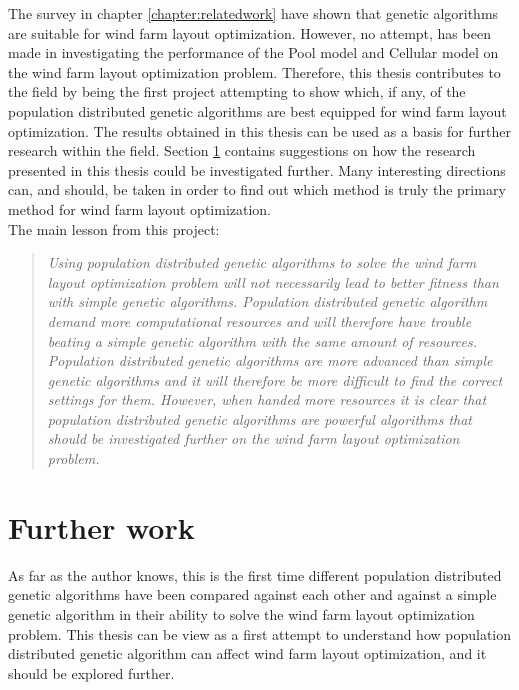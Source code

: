 \noindent The survey in chapter \ref{chapter:relatedwork} have shown that genetic algorithms are suitable for wind farm layout optimization. However, no attempt, has been made in investigating the performance of the Pool model and Cellular model on the wind farm layout optimization problem. Therefore, this thesis contributes to the field by being the first project attempting to show which, if any, of the population distributed genetic algorithms are best equipped for wind farm layout optimization. The results obtained in this thesis can be used as a basis for further research within the field. Section \ref{section:further work} contains suggestions on how the research presented in this thesis could be investigated further. Many interesting directions can, and should, be taken in order to find out which method is truly the primary method for wind farm layout optimization.\\


\noindent The main lesson from this project:\\


\begin{quote}
\textit{Using population distributed genetic algorithms to solve the wind farm layout optimization problem will not necessarily lead to better fitness than with simple genetic algorithms. Population distributed genetic algorithm demand more computational resources and will therefore have trouble beating a simple genetic algorithm with the same amount of resources. Population distributed genetic algorithms are more advanced than simple genetic algorithms and it will therefore be more difficult to find the correct settings for them. However, when handed more resources it is clear that population distributed genetic algorithms are powerful algorithms that should be investigated further on the wind farm layout optimization problem.}
\end{quote}


\section{Further work}\label{section:further work}
As far as the author knows, this is the first time different population distributed genetic algorithms have been compared against each other and against a simple genetic algorithm in their ability to solve the wind farm layout optimization problem. This thesis can be view as a first attempt to understand how population distributed genetic algorithm can affect wind farm layout optimization, and it should be explored further.\\


